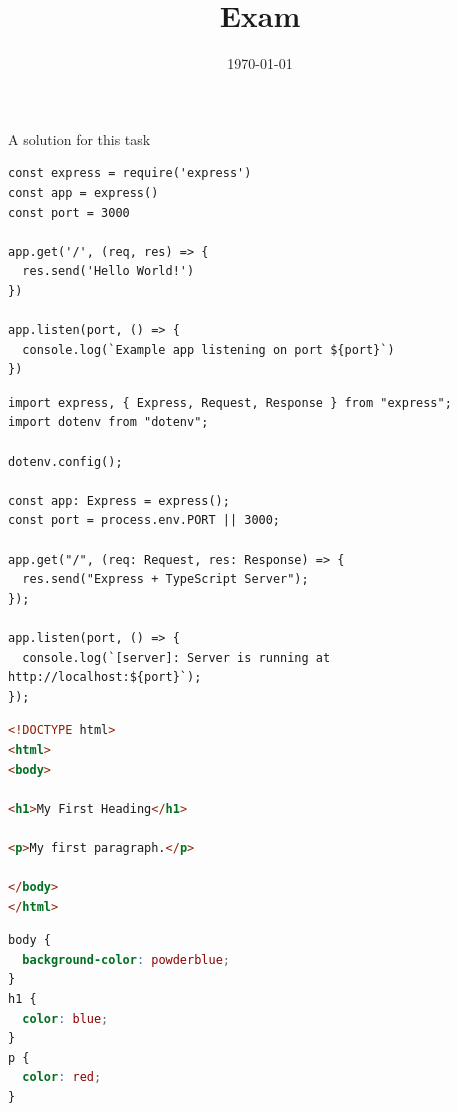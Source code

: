\documentclass[german]{mni-thm-exam}
\title{Exam}
\date{\today}
\begin{document}
\TitlePage



\begin{solution}
A solution for this task	
\end{solution}








\begin{lstlisting}[caption={Express -- Application Code A.}, label={lst:exprA}, language=JS]
const express = require('express')
const app = express()
const port = 3000

app.get('/', (req, res) => {
  res.send('Hello World!')
})

app.listen(port, () => {
  console.log(`Example app listening on port ${port}`)
})
\end{lstlisting}


\begin{lstlisting}[caption={Express -- Application Code B.}, label={lst:exprB}, language=TS]
import express, { Express, Request, Response } from "express";
import dotenv from "dotenv";

dotenv.config();

const app: Express = express();
const port = process.env.PORT || 3000;

app.get("/", (req: Request, res: Response) => {
  res.send("Express + TypeScript Server");
});

app.listen(port, () => {
  console.log(`[server]: Server is running at http://localhost:${port}`);
});
\end{lstlisting}


\begin{lstlisting}[caption={HTML -- Application Code C.}, label={lst:exprC}, language=HTML]
<!DOCTYPE html>
<html>
<body>

<h1>My First Heading</h1>

<p>My first paragraph.</p>

</body>
</html>
\end{lstlisting}



\begin{lstlisting}[caption={CSS -- Application Code D.}, label={lst:exprD}, language=CSS]
body {
  background-color: powderblue;
}
h1 {
  color: blue;
}
p {
  color: red;
}
\end{lstlisting}

\iftoggle{showSolution}{}{
\cleardoublepage
\foreach \x in {A, B} {
\begin{center}
\textbf{\ifthenelse{\equal{\examLanguage}{german}}{Zusatzblatt}
{Supplementary Sheet} \x}
\end{center}
\writingSpace{19}
}
}
\end{document}
